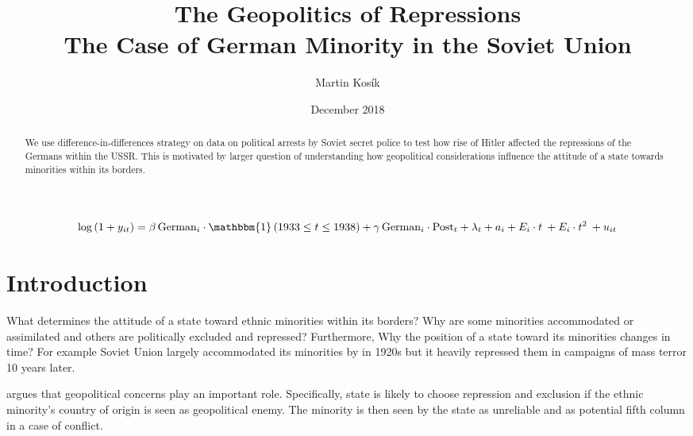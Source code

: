 \documentclass[11pt]{article}
\title{The Geopolitics of Repressions \\
  \large The Case of German Minority in the Soviet Union}
\author{Martin Kosík}
\date{December 2018}
\begin{document}
\maketitle

\begin{abstract}
    We use difference-in-differences strategy on data on political arrests by Soviet secret police to test how rise of Hitler affected the repressions of the Germans within the USSR. This is motivated by larger question of understanding how geopolitical considerations influence the attitude of a state towards minorities within its borders. 
\end{abstract}


\begin{equation}
\begin{split}
 \log\left(1 + y_{it}\right) =  \beta \, \text{German}_{i} \cdot  \mathbbm{1}\left(1933 \leq t \leq 1938 \right) +
 \gamma \, \text{German}_{i} \cdot \text{Post}_{t} +
 \lambda_t + a_i +  E_i \cdot t \:  + E_i \cdot t^2 \:    + u_{it}
 \label{eq:simple_did}
 \end{split}
\end{equation}

\section{Introduction}
What determines the attitude of a state toward ethnic minorities within its borders? Why are some minorities accommodated or assimilated and others are politically excluded and repressed? Furthermore,  Why the position of a state toward its minorities changes in time? For example Soviet Union largely accommodated its minorities by in 1920s but it heavily repressed them in campaigns of mass terror 10 years later. 










\citet{mylonas_politics_2013} argues that geopolitical concerns play an important role. Specifically, state is likely to choose repression and exclusion if the ethnic minority's country of origin is seen as geopolitical enemy. The minority is then seen by the state as unreliable and  as potential fifth column in a case of conflict.  
\end{document}
